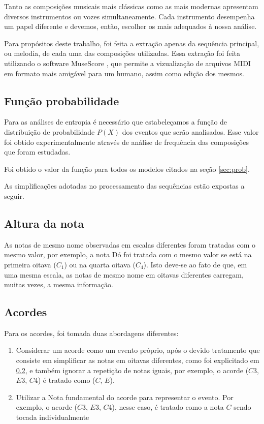 Tanto as composições musicais mais clássicas como as mais modernas apresentam diversos instrumentos ou vozes simultaneamente. Cada instrumento desempenha um papel diferente e devemos, então, escolher os mais adequados à nossa análise.

Para propósitos deste trabalho, foi feita a extração apenas da sequência principal, ou melodia, de cada uma das composições utilizadas. Essa extração foi feita utilizando o software MuseScore \cite{musescore}, que permite a vizualização de arquivos MIDI em formato mais amigável para um humano, assim como edição dos mesmos.


\subsection{Função probabilidade}

Para as análises de entropia é necessário que estabeleçamos a função de distribuição de probabilidade $P(X)$ dos eventos que serão analisados. Esse valor foi obtido experimentalmente através de análise de frequência das composições que foram estudadas.

Foi obtido o valor da função para todos os modelos citados na seção \ref{sec:prob}.

As simplificações adotadas no processamento das sequências estão expostas a seguir.

\subsection{Altura da nota}\label{section:altura_da_nota}

As notas de mesmo nome observadas em escalas diferentes foram tratadas com o mesmo valor, por exemplo, a nota Dó foi tratada com o mesmo valor se está na primeira oitava ($C_1$) ou na quarta oitava ($C_4$). Isto deve-se ao fato de que, em uma mesma escala, as notas de mesmo nome em oitavas diferentes carregam, muitas vezes, a mesma informação.

\subsection{Acordes}

Para os acordes, foi tomada duas abordagens diferentes:

\begin{enumerate}
    \item Considerar um acorde como um evento próprio, após o devido tratamento que consiste em simplificar as notas em oitavas diferentes, como foi explicitado em \ref{section:altura_da_nota}, e também ignorar a repetição de notas iguais, por exemplo, o acorde ($C3$, $E3$, $C4$) é tratado como ($C$, $E$).

    \item Utilizar a Nota fundamental do acorde para representar o evento. Por exemplo, o acorde ($C3$, $E3$, $C4$), nesse caso, é tratado como a nota $C$ sendo tocada individualmente
\end{enumerate}

